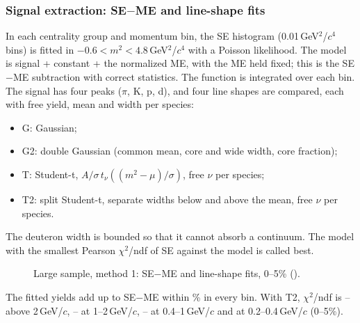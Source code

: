 \subsubsection{Signal extraction: SE$-$ME and line-shape fits}
\label{sec:bigfit}
In each centrality group and momentum bin, the SE histogram (0.01\,GeV$^2$/$c^4$ bins) is fitted in $-0.6<m^2<4.8$\,GeV$^2$/$c^4$
with a Poisson likelihood. The model is signal + constant + the normalized ME, with the ME held fixed; this is the SE$-$ME
subtraction with correct statistics. The function is integrated over each bin. The signal has four peaks ($\pi$, K, p, d), and
four line shapes are compared, each with free yield, mean and width per species:
\begin{itemize}
\item G: Gaussian;
\item G2: double Gaussian (common mean, core and wide width, core fraction);
\item T: Student-t, $A/\sigma\,t_\nu((m^2-\mu)/\sigma)$, free $\nu$ per species;
\item T2: split Student-t, separate widths below and above the mean, free $\nu$ per species.
\end{itemize}
The deuteron width is bounded so that it cannot absorb a continuum. The model with the smallest Pearson $\chi^2$/ndf of SE
against the model is called best.


\begin{figure}[H]
\centering
{}
\caption{Large sample, method 1: SE$-$ME and line-shape fits, 0--5\% ().}
\end{figure}



The fitted yields add up to SE$-$ME within \bigSumYDev\% in every bin. With T2, $\chi^2$/ndf is \bigTtwoChiTopMin--\bigTtwoChiTopMax{}
above 2\,GeV/$c$, \bigTtwoChiHiMin--\bigTtwoChiHiMax{} at 1--2\,GeV/$c$, \bigTtwoChiMidMin--\bigTtwoChiMidMax{} at 0.4--1\,GeV/$c$ and
\bigTtwoChiLowP{} at 0.2--0.4\,GeV/$c$ (0--5\%).

